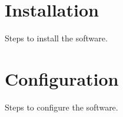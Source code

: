 \documentclass{article}
\begin{document}
\tableofcontents

\section{Installation}

Steps to install the software.

\section{Configuration}

Steps to configure the software.
\end{document}
